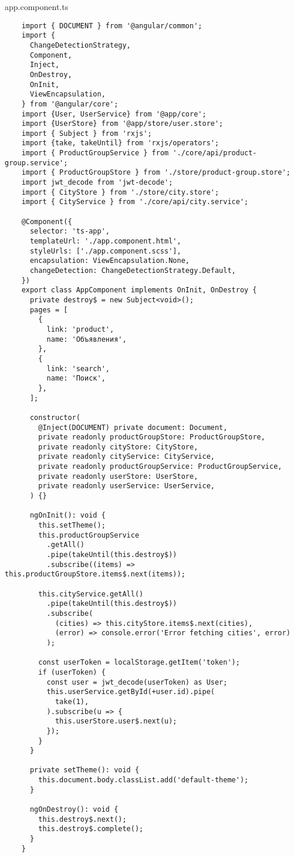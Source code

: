 app.component.ts
\lstset{style=ts}
\begin{lstlisting}
    import { DOCUMENT } from '@angular/common';
    import {
      ChangeDetectionStrategy,
      Component,
      Inject,
      OnDestroy,
      OnInit,
      ViewEncapsulation,
    } from '@angular/core';
    import {User, UserService} from '@app/core';
    import {UserStore} from '@app/store/user.store';
    import { Subject } from 'rxjs';
    import {take, takeUntil} from 'rxjs/operators';
    import { ProductGroupService } from './core/api/product-group.service';
    import { ProductGroupStore } from './store/product-group.store';
    import jwt_decode from 'jwt-decode';
    import { CityStore } from './store/city.store';
    import { CityService } from './core/api/city.service';
    
    @Component({
      selector: 'ts-app',
      templateUrl: './app.component.html',
      styleUrls: ['./app.component.scss'],
      encapsulation: ViewEncapsulation.None,
      changeDetection: ChangeDetectionStrategy.Default,
    })
    export class AppComponent implements OnInit, OnDestroy {
      private destroy$ = new Subject<void>();
      pages = [
        {
          link: 'product',
          name: 'Объявления',
        },
        {
          link: 'search',
          name: 'Поиск',
        },
      ];
    
      constructor(
        @Inject(DOCUMENT) private document: Document,
        private readonly productGroupStore: ProductGroupStore,
        private readonly cityStore: CityStore,
        private readonly cityService: CityService,
        private readonly productGroupService: ProductGroupService,
        private readonly userStore: UserStore,
        private readonly userService: UserService,
      ) {}
    
      ngOnInit(): void {
        this.setTheme();
        this.productGroupService
          .getAll()
          .pipe(takeUntil(this.destroy$))
          .subscribe((items) => this.productGroupStore.items$.next(items));
    
        this.cityService.getAll()
          .pipe(takeUntil(this.destroy$))
          .subscribe(
            (cities) => this.cityStore.items$.next(cities),
            (error) => console.error('Error fetching cities', error)
          );
    
        const userToken = localStorage.getItem('token');
        if (userToken) {
          const user = jwt_decode(userToken) as User;
          this.userService.getById(+user.id).pipe(
            take(1),
          ).subscribe(u => {
            this.userStore.user$.next(u);
          });
        }
      }
    
      private setTheme(): void {
        this.document.body.classList.add('default-theme');
      }
    
      ngOnDestroy(): void {
        this.destroy$.next();
        this.destroy$.complete();
      }
    }    
\end{lstlisting}

